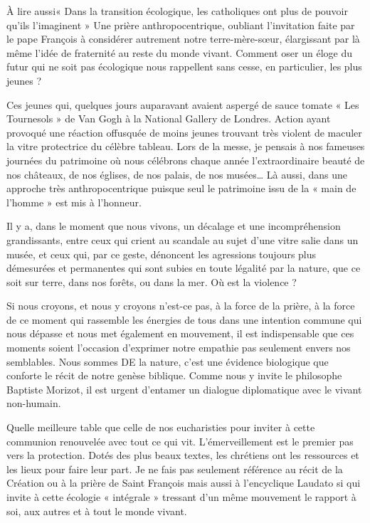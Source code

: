 À lire aussi« Dans la transition écologique, les catholiques ont plus de pouvoir qu’ils l’imaginent »
Une prière anthropocentrique, oubliant l’invitation faite par le pape François à considérer autrement notre terre-mère-sœur, élargissant par là même l’idée de fraternité au reste du monde vivant. Comment oser un éloge du futur qui ne soit pas écologique nous rappellent sans cesse, en particulier, les plus jeunes ?
 
Ces jeunes qui, quelques jours auparavant avaient aspergé de sauce tomate « Les Tournesols » de Van Gogh à la National Gallery de Londres. Action ayant provoqué une réaction offusquée de moins jeunes trouvant très violent de maculer la vitre protectrice du célèbre tableau. Lors de la messe, je pensais à nos fameuses journées du patrimoine où nous célébrons chaque année l’extraordinaire beauté de nos châteaux, de nos églises, de nos palais, de nos musées… Là aussi, dans une approche très anthropocentrique puisque seul le patrimoine issu de la « main de l’homme » est mis à l’honneur.

Il y a, dans le moment que nous vivons, un décalage et une incompréhension grandissants, entre ceux qui crient au scandale au sujet d’une vitre salie dans un musée, et ceux qui, par ce geste, dénoncent les agressions toujours plus démesurées et permanentes qui sont subies en toute légalité par la nature, que ce soit sur terre, dans nos forêts, ou dans la mer. Où est la violence ?
 
Si nous croyons, et nous y croyons n’est-ce pas, à la force de la prière, à la force de ce moment qui rassemble les énergies de tous dans une intention commune qui nous dépasse et nous met également en mouvement, il est indispensable que ces moments soient l’occasion d’exprimer notre empathie pas seulement envers nos semblables. Nous sommes DE la nature, c’est une évidence biologique que conforte le récit de notre genèse biblique. Comme nous y invite le philosophe Baptiste Morizot, il est urgent d’entamer un dialogue diplomatique avec le vivant non-humain.


Quelle meilleure table que celle de nos eucharisties pour inviter à cette communion renouvelée avec tout ce qui vit. L’émerveillement est le premier pas vers la protection. Dotés des plus beaux textes, les chrétiens ont les ressources et les lieux pour faire leur part. Je ne fais pas seulement référence au récit de la Création ou à la prière de Saint François mais aussi à l’encyclique Laudato si qui invite à cette écologie « intégrale » tressant d’un même mouvement le rapport à soi, aux autres et à tout le monde vivant.
